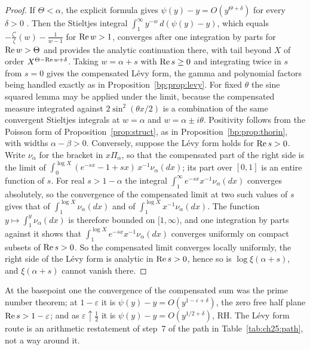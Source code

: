 \begin{proof}
If $\Theta<\alpha$, the explicit formula gives $\psi(y)-y=O(y^{\Theta+\delta})$ for every $\delta>0$ \cite{Titchmarsh}. Then the Stieltjes integral $\int_1^\infty y^{-w}\,d(\psi(y)-y)$, which equals $-\frac{\zeta'}{\zeta}(w)-\frac1{w-1}$ for $\operatorname{Re} w>1$, converges after one integration by parts for $\operatorname{Re} w>\Theta$ and provides the analytic continuation there, with tail beyond $X$ of order $X^{\Theta-\operatorname{Re} w+\delta}$. Taking $w=\alpha+s$ with $\operatorname{Re} s\ge0$ and integrating twice in $s$ from $s=0$ gives the compensated L\'evy form, the gamma and polynomial factors being handled exactly as in Proposition~\ref{bp:prop:levy}. For fixed $\theta$ the sine squared lemma may be applied under the limit, because the compensated measure integrated against $2\sin^2(\theta x/2)$ is a combination of the same convergent Stieltjes integrals at $w=\alpha$ and $w=\alpha\pm i\theta$. Positivity follows from the Poisson form of Proposition~\ref{prop:struct}, as in Proposition~\ref{bp:prop:thorin}, with widths $\alpha-\beta>0$. Conversely, suppose the L\'evy form holds for $\operatorname{Re} s>0$. Write $\nu_\alpha$ for the bracket in $x\Pi_\alpha$, so that the compensated part of the right side is the limit of $\int_0^{\log X}(e^{-sx}-1+sx)\,x^{-1}\nu_\alpha(dx)$; its part over $[0,1]$ is an entire function of $s$. For real $s>1-\alpha$ the integral $\int_1^\infty e^{-sx}x^{-1}\nu_\alpha(dx)$ converges absolutely, so the convergence of the compensated limit at two such values of $s$ gives that of $\int_1^{\log X}\nu_\alpha(dx)$ and of $\int_1^{\log X}x^{-1}\nu_\alpha(dx)$. The function $y\mapsto\int_1^y\nu_\alpha(dx)$ is therefore bounded on $[1,\infty)$, and one integration by parts against it shows that $\int_1^{\log X}e^{-sx}x^{-1}\nu_\alpha(dx)$ converges uniformly on compact subsets of $\operatorname{Re} s>0$. So the compensated limit converges locally uniformly, the right side of the L\'evy form is analytic in $\operatorname{Re} s>0$, hence so is $\log\xi(\alpha+s)$, and $\xi(\alpha+s)$ cannot vanish there.
\end{proof}

At the basepoint one the convergence of the compensated sum was the prime number theorem; at $1-\varepsilon$ it is $\psi(y)-y=O(y^{1-\varepsilon+\delta})$, the zero free half plane $\operatorname{Re} s>1-\varepsilon$; and as $\varepsilon\uparrow\frac12$ it is $\psi(y)-y=O(y^{1/2+\delta})$, RH. The L\'evy form route is an arithmetic restatement of step~7 of the path in Table~\ref{tab:ch25:path}, not a way around it.

